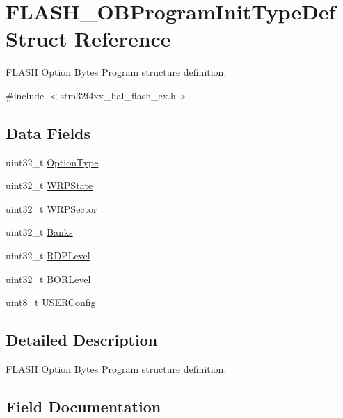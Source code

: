\hypertarget{struct_f_l_a_s_h___o_b_program_init_type_def}{}\section{F\+L\+A\+S\+H\+\_\+\+O\+B\+Program\+Init\+Type\+Def Struct Reference}
\label{struct_f_l_a_s_h___o_b_program_init_type_def}


F\+L\+A\+SH Option Bytes Program structure definition.  




{\ttfamily \#include $<$stm32f4xx\+\_\+hal\+\_\+flash\+\_\+ex.\+h$>$}

\subsection*{Data Fields}
\begin{DoxyCompactItemize}
\item 
uint32\+\_\+t \hyperlink{struct_f_l_a_s_h___o_b_program_init_type_def_a46bffc2a63ea02e15b9187856535d890}{Option\+Type}
\item 
uint32\+\_\+t \hyperlink{struct_f_l_a_s_h___o_b_program_init_type_def_a2607ba046f7a3af46e7209b8f1e9e20d}{W\+R\+P\+State}
\item 
uint32\+\_\+t \hyperlink{struct_f_l_a_s_h___o_b_program_init_type_def_aa3db423f4b3038a56b67ca2d48af79ff}{W\+R\+P\+Sector}
\item 
uint32\+\_\+t \hyperlink{struct_f_l_a_s_h___o_b_program_init_type_def_a5fdf437b5f79d79945f5c0777f76d0eb}{Banks}
\item 
uint32\+\_\+t \hyperlink{struct_f_l_a_s_h___o_b_program_init_type_def_a1f613ba2b87cf9caa84dc1d493e96dae}{R\+D\+P\+Level}
\item 
uint32\+\_\+t \hyperlink{struct_f_l_a_s_h___o_b_program_init_type_def_a51a6af507ed8f57590f19b6ba6c9c33d}{B\+O\+R\+Level}
\item 
uint8\+\_\+t \hyperlink{struct_f_l_a_s_h___o_b_program_init_type_def_ae6c9b55d49bc9627a2319ba680a924de}{U\+S\+E\+R\+Config}
\end{DoxyCompactItemize}


\subsection{Detailed Description}
F\+L\+A\+SH Option Bytes Program structure definition. 

\subsection{Field Documentation}
\mbox{\label{struct_f_l_a_s_h___o_b_program_init_type_def_a5fdf437b5f79d79945f5c0777f76d0eb}} 
